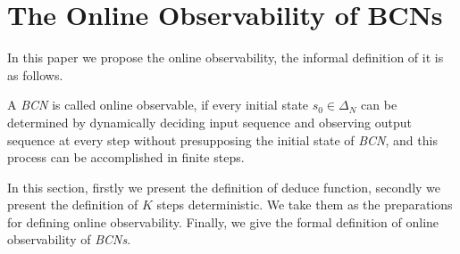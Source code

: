\section{The Online Observability of BCNs}
In this paper we propose the online observability, the informal definition of it is as follows. 

\begin{definition}
	A {\em BCN} is called online observable, if every initial state $s_0 \in \Delta_N$ can be determined by dynamically deciding input sequence and observing output sequence at every step without presupposing the  initial state of {\em BCN}, and this process can be accomplished in finite steps.
\end{definition}


In this section, firstly we present the definition of deduce function, secondly we present the definition of $K$ steps deterministic. We take them as the preparations for defining online observability. Finally, we give the formal definition of online observability of {\em BCNs}. 
